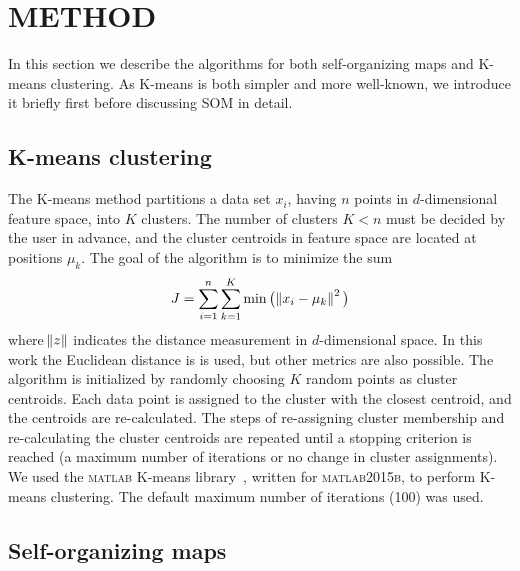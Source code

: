 \section{METHOD}
\label{sec: method_somz}

In this section we describe the algorithms for both self-organizing maps and K-means clustering. As K-means is both simpler and more well-known, we introduce it briefly first before discussing SOM in detail. 


\subsection{K-means clustering}
\label{sec: kmeans_method}


The K-means method partitions a data set $x_i$, having $n$ points in $d$-dimensional feature space, into $K$ clusters.
The number of clusters $K<n$ must be decided by the user in advance, and the cluster centroids in feature space are located at positions $\mu_k$.
The goal of the algorithm is to minimize the sum
\begin{equation}
\label{eq:km_sos}
J = \sum_{i=1}^n \sum_{k=1}^K \min \big( \norm{x_i - \mu_k}^2 \big)
\end{equation}
where $\norm{z}$ indicates the distance measurement in $d$-dimensional space. In this work the Euclidean distance is is used, but other metrics are also possible.
The algorithm is initialized by randomly choosing $K$ random points as cluster centroids.
Each data point is assigned to the cluster with the closest centroid, and the centroids are re-calculated.
The steps of re-assigning cluster membership and re-calculating the cluster centroids are repeated until a stopping criterion is reached (a maximum number of iterations or no change in cluster assignments).
We used the \textsc{matlab} K-means library~\citep{Seber84, Spath85}, written for \textsc{matlab2015b}, to perform  K-means clustering.
The default maximum number of iterations (100) was used.



 \subsection{Self-organizing maps}
 \label{sec: som}
 
